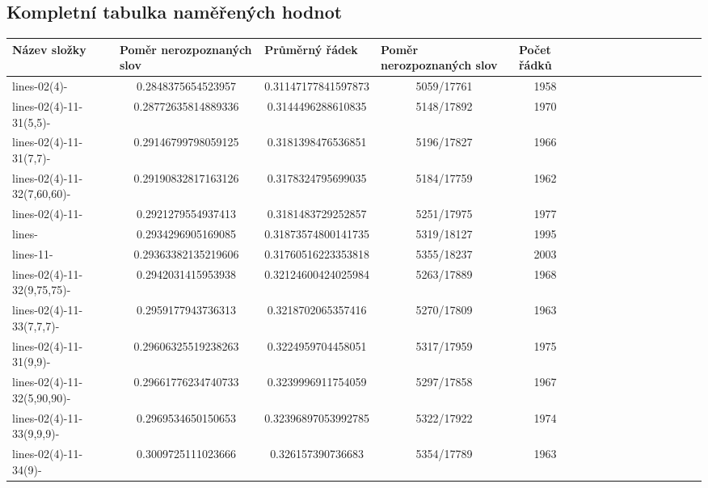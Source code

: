 \documentclass[12pt]{report}			%
\begin{document}
\begin{landscape}
\section{Kompletní tabulka naměřených hodnot}

\begin{longtable}{ | p{5cm} | *{15}{c|}}
\hline
\multicolumn{1}{|l|}{Název složky}                & \multicolumn{1}{l|}{Poměr nerozpoznaných slov} & \multicolumn{1}{l|}{Průměrný řádek} & \multicolumn{1}{l|}{Poměr nerozpoznaných slov} & \multicolumn{1}{l|}{Počet řádků} \\ \hline
lines-02(4)-                                      & 0.2848375654523957  & 0.31147177841597873 & 5059/17761  & 1958 \\
lines-02(4)-11-31(5,5)-                           & 0.28772635814889336 & 0.3144496288610835  & 5148/17892  & 1970 \\
lines-02(4)-11-31(7,7)-                           & 0.29146799798059125 & 0.3181398476536851  & 5196/17827  & 1966 \\
lines-02(4)-11-32(7,60,60)-                       & 0.29190832817163126 & 0.3178324795699035  & 5184/17759  & 1962 \\
lines-02(4)-11-                                   & 0.2921279554937413  & 0.3181483729252857  & 5251/17975  & 1977 \\
lines-                                            & 0.2934296905169085  & 0.31873574800141735 & 5319/18127  & 1995 \\
lines-11- & 0.29363382135219606 & 0.31760516223353818 & 5355/18237 & 2003 \\
lines-02(4)-11-32(9,75,75)-                       & 0.2942031415953938  & 0.32124600424025984 & 5263/17889  & 1968 \\
lines-02(4)-11-33(7,7,7)-                        & 0.2959177943736313  & 0.3218702065357416  & 5270/17809  & 1963 \\
lines-02(4)-11-31(9,9)-                           & 0.29606325519238263 & 0.3224959704458051  & 5317/17959  & 1975 \\
lines-02(4)-11-32(5,90,90)-                       & 0.29661776234740733 & 0.3239996911754059  & 5297/17858  & 1967 \\
lines-02(4)-11-33(9,9,9)-                         & 0.2969534650150653  & 0.32396897053992785 & 5322/17922  & 1974 \\
lines-02(4)-11-34(9)-                             & 0.3009725111023666  & 0.326157390736683   & 5354/17789  & 1963 \\

\end{longtable}
\end{landscape}
\end{document}
